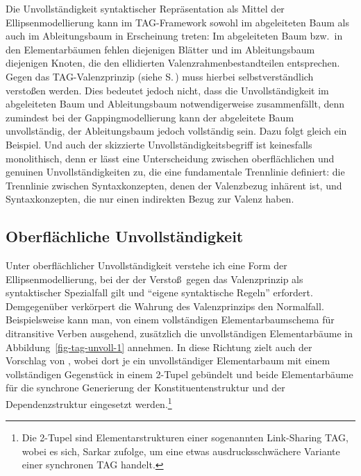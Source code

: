 Die Unvollständigkeit syntaktischer Repräsentation als Mittel der Ellipsenmodellierung kann im TAG-Framework sowohl im abgeleiteten Baum als auch im Ableitungsbaum in Erscheinung treten: Im abgeleiteten Baum bzw.\ in den Elementarbäumen fehlen diejenigen Blätter und im Ableitungsbaum diejenigen Knoten, die den ellidierten Valenzrahmenbestandteilen entsprechen. Gegen das TAG-Valenzprinzip (siehe S.\,\pageref{ex-valenzprinzip-tag}) muss hierbei selbstverständlich versto\ss en werden. Dies bedeutet jedoch nicht, dass die Unvollständigkeit im abgeleiteten Baum und Ableitungsbaum notwendigerweise zusammenfällt, denn zumindest bei der Gappingmodellierung kann der abgeleitete Baum unvollständig, der Ableitungsbaum jedoch vollständig sein. Dazu folgt gleich ein Beispiel. Und auch der skizzierte  Unvollständigkeitsbegriff ist keinesfalls monolithisch, denn er lässt eine Unterscheidung zwischen oberflächlichen und genuinen Unvollständigkeiten zu, die eine fundamentale Trennlinie definiert: die Trennlinie zwischen Syntaxkonzepten, denen der Valenzbezug inhärent ist, und Syntaxkonzepten, die nur einen indirekten Bezug zur Valenz haben.


\subsection{Oberflächliche Unvollständigkeit}

\largerpage%
Unter oberflächlicher Unvollständigkeit verstehe ich eine Form der Ellipsenmodellierung, bei der der Versto\ss\ gegen das Valenzprinzip als syntaktischer Spezialfall gilt und "`eigene syntaktische Regeln"' \citep{Klein:93} erfordert. Demgegenüber verkörpert die Wahrung des Valenzprinzips den Normalfall. Beispielsweise kann man, von einem vollständigen Elementarbaumschema für ditransitive Verben ausgehend, zusätzlich die unvollständigen Elementarbäume in Abbildung~\ref{fig-tag-unvoll-1} annehmen. In diese Richtung zielt auch der Vorschlag von \cite{Sarkar:97}, wobei dort je ein unvollständiger Elementarbaum mit einem vollständigen Gegenstück in einem 2-Tupel gebündelt und beide Elementarbäume für die synchrone Generierung der Konstituentenstruktur und der Dependenzstruktur eingesetzt werden.\footnote{Die 2-Tupel sind Elementarstrukturen einer sogenannten Link-Sharing TAG, wobei es sich, Sarkar zufolge, um eine etwas ausdrucksschwächere Variante einer synchronen TAG \citep{Shieber:Schabes:90} handelt.} 

